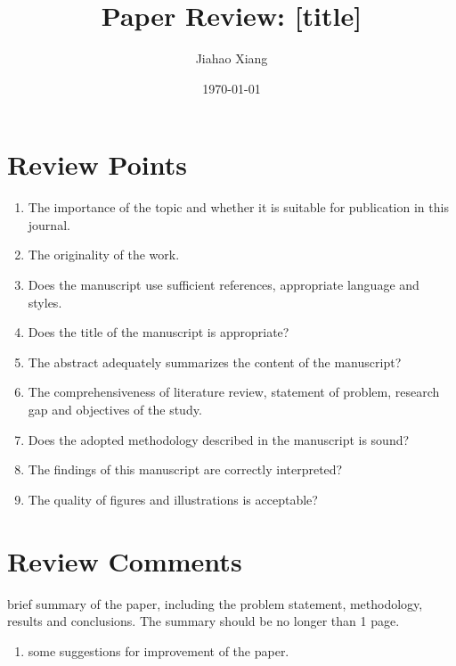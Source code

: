 \documentclass{article}
\title{Paper Review: [title]}
\author{Jiahao Xiang}
\date{\today}
\begin{document}
\maketitle

\section{Review Points}
\begin{enumerate}
    \item The importance of the topic and whether it is suitable for publication in this journal.
    \item The originality of the work.
    \item Does the manuscript use sufficient references, appropriate language and styles.
    \item Does the title of the manuscript is appropriate?
    \item The abstract adequately summarizes the content of the manuscript?
    \item The comprehensiveness of literature review, statement of problem, research gap and objectives of the study.
    \item Does the adopted methodology described in the manuscript is sound?
    \item The findings of this manuscript are correctly interpreted?
    \item The quality of figures and illustrations is acceptable?
\end{enumerate}

\section{Review Comments}
brief summary of the paper, including the problem statement, methodology, results and conclusions. The summary should be no longer than 1 page. 
\begin{enumerate}
    \item some suggestions for improvement of the paper.
\end{enumerate}

% 
\end{document}
